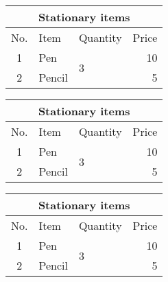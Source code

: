 \documentclass{article}
\begin{document}
	
	
		\begin{tabular}{|c|l|l|r|}
		\hline
		\multicolumn{4}{c}{Stationary items} \\ %
		\hline
		No. & Item & Quantity & Price \\
		\hline
		1 & Pen & \multirow{2}{*}{3} & 10 \\
		\cline{1-2}\cline{4-4}
		2 & Pencil & & 5 \\
		\hline
	\end{tabular}

\vspace{10pt}

	\begin{tabular}{|c|l|l|r|}
		\hline
		\multicolumn{4}{|c|}{Stationary items} \\ %
		\hline
		No. & Item & Quantity & Price \\
		\hline
		1 & Pen & \multirow{2}{*}{3} & 10 \\
		\cline{1-2}\cline{4-4}
		2 & Pencil & & 5 \\
		\hline
	\end{tabular}

\vspace{10pt}

\renewcommand{\arraystretch}{1.5}
\begin{tabular}{|c|l|l|r|}
	\hline
	\multicolumn{4}{|c|}{Stationary items} \\
	\hline
	No. & Item & Quantity & Price \\
	\hline
	1 & Pen & \multirow{2}{*}{3} & 10 \\
	\cline{1-2}\cline{4-4}
	2 & Pencil & & 5 \\
	\hline
\end{tabular}
\end{document}
